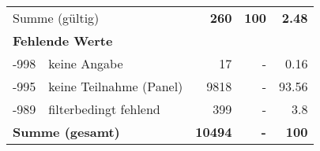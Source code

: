 \begin{longtable}{lXrrr}
     \midrule
     \multicolumn{2}{l}{Summe (gültig)} &
       \textbf{\num{260}} &
     \textbf{\num{100}} &
       \textbf{\num[round-mode=places,round-precision=2]{2.48}} \\
     \multicolumn{5}{l}{\textbf{Fehlende Werte}}\\
       -998 &
       keine Angabe &
         \num{17} &
        - &
         \num[round-mode=places,round-precision=2]{0.16} \\
       -995 &
       keine Teilnahme (Panel) &
         \num{9818} &
        - &
         \num[round-mode=places,round-precision=2]{93.56} \\
       -989 &
       filterbedingt fehlend &
         \num{399} &
        - &
         \num[round-mode=places,round-precision=2]{3.8} \\
     \midrule
     \multicolumn{2}{l}{\textbf{Summe (gesamt)}} &
          \textbf{\num{10494}} &
        \textbf{-} &
        \textbf{\num{100}} \\
     \bottomrule
     \end{longtable}
     
